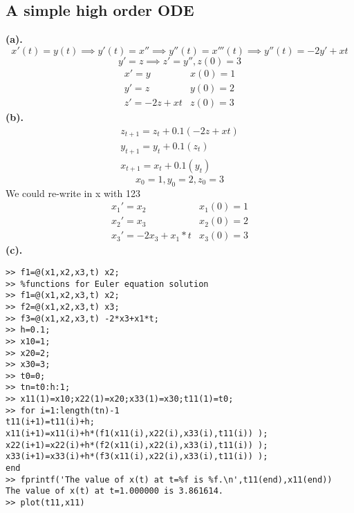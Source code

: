 \subsection{A simple high order ODE}
\textbf{(a).}
\[x'(t)=y(t)\implies y'(t)=x''\implies y''(t)=x'''(t)\implies y''(t)=-2y'+xt\]
\[y'=z\implies z'=y'',z(0)=3\]
\[\begin{array}{c|c}
   x'=y  & x(0)=1  \\
    y'=z & y(0)=2\\
    z'=-2z+xt & z(0)=3
\end{array}\]
\textbf{(b).}
\begin{align*}
    z_{t+1}=z_t+0.1(-2z+xt)\\
    y_{t+1}=y_t+0.1(z_t)\\
    x_{t+1}=x_t+0.1(y_t)
\end{align*}
\[x_0=1,y_0=2,z_0=3\]
We could re-write in x with 123 \[
\begin{array}{c|c}
    x_1'=x_2 & x_1(0)=1 \\
    x_2'=x_3 & x_2(0)=2  \\
    x_3'=-2x_3+ x_1*t&x_3(0)=3
\end{array}\]
\textbf{(c).}
\begin{verbatim}
>> f1=@(x1,x2,x3,t) x2;
>> %functions for Euler equation solution
>> f1=@(x1,x2,x3,t) x2;
>> f2=@(x1,x2,x3,t) x3;
>> f3=@(x1,x2,x3,t) -2*x3+x1*t;
>> h=0.1;
>> x10=1;
>> x20=2;
>> x30=3;
>> t0=0;
>> tn=t0:h:1;
>> x11(1)=x10;x22(1)=x20;x33(1)=x30;t11(1)=t0;
>> for i=1:length(tn)-1
t11(i+1)=t11(i)+h;
x11(i+1)=x11(i)+h*(f1(x11(i),x22(i),x33(i),t11(i)) );
x22(i+1)=x22(i)+h*(f2(x11(i),x22(i),x33(i),t11(i)) );
x33(i+1)=x33(i)+h*(f3(x11(i),x22(i),x33(i),t11(i)) );
end
>> fprintf('The value of x(t) at t=%f is %f.\n',t11(end),x11(end))
The value of x(t) at t=1.000000 is 3.861614.
>> plot(t11,x11)
\end{verbatim}
\newpage
